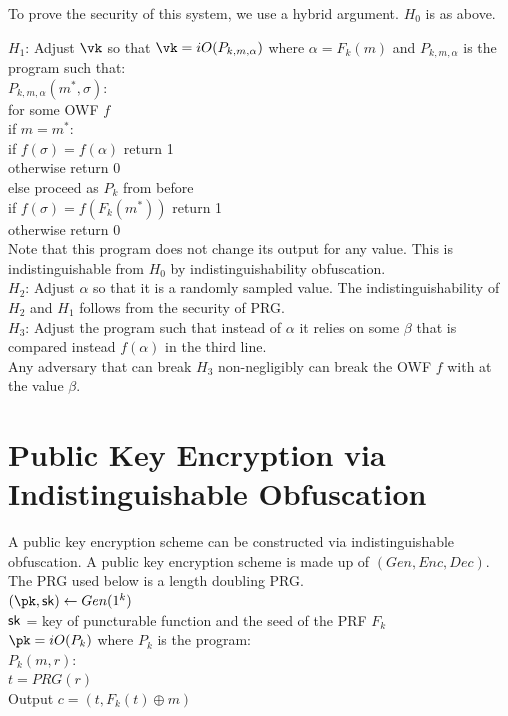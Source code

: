 \documentclass[12pt]{tufte-book}
\begin{document}
\noindent To prove the security of this system, we use a hybrid argument.  $H_0$ is as above.

\noindent $H_1$: Adjust $\vk$ so that $\vk = iO(P_{k, m, \alpha})$ where $\alpha = F_k(m)$ and $P_{k, m, \alpha}$ is the program such that:\\
\indent $P_{k,m, \alpha}(m^*, \sigma)$:\\
\indent \indent for some OWF $f$\\
\indent \indent \indent if $m = m^*$:\\
\indent \indent \indent \indent if $f(\sigma) = f(\alpha)$ return 1\\
\indent \indent \indent \indent otherwise return 0\\
\indent \indent \indent else proceed as $P_{k}$ from before\\
\indent \indent \indent \indent if $f(\sigma) = f(F_k(m^*))$ return 1\\
\indent \indent \indent \indent otherwise return 0\\
\noindent Note that this program does not change its output for any value. This is indistinguishable from $H_0$  by indistinguishability obfuscation.\\

\noindent $H_2$: Adjust $\alpha$ so that it is a randomly sampled value. The indistinguishability of $H_2$ and $H_1$ follows from the security of PRG.  \\
\noindent $H_3$: Adjust the program such that instead of $\alpha$ it relies on some $\beta$ that is compared instead $f(\alpha)$ in the third line.\\

Any adversary that can break $H_3$ non-negligibly can break the OWF $f$ with at the value $\beta$.

\section{Public Key Encryption via Indistinguishable Obfuscation}
A public key encryption scheme can be constructed via indistinguishable obfuscation.  A public key encryption scheme is made up of $(Gen, Enc, Dec)$.  The PRG used below is a length doubling PRG.\\

\noindent $(\pk, \sk) \leftarrow Gen(1^k)$\\
\indent $\mathsf{sk}$ = key of puncturable function and the seed of the PRF $F_k$\\
\indent $\pk = iO(P_k)$ where $P_k$ is the program:\\
\indent \indent $P_k(m, r)$:\\
\indent \indent \indent $t = PRG(r)$\\
\indent \indent \indent Output $c = (t, F_k(t) \oplus m)$\\
\end{document}
